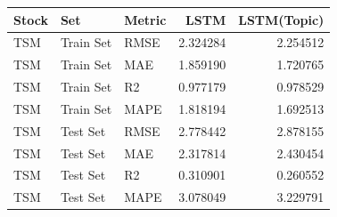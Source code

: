 \begin{tabular}{lllrr}
\toprule
Stock & Set & Metric & LSTM & LSTM(Topic) \\
\midrule
TSM & Train Set & RMSE & 2.324284 & 2.254512 \\
TSM & Train Set & MAE & 1.859190 & 1.720765 \\
TSM & Train Set & R2 & 0.977179 & 0.978529 \\
TSM & Train Set & MAPE & 1.818194 & 1.692513 \\
TSM & Test Set & RMSE & 2.778442 & 2.878155 \\
TSM & Test Set & MAE & 2.317814 & 2.430454 \\
TSM & Test Set & R2 & 0.310901 & 0.260552 \\
TSM & Test Set & MAPE & 3.078049 & 3.229791 \\
\bottomrule
\end{tabular}
